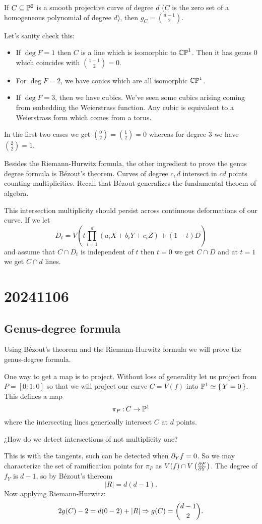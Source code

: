 \documentclass[12pt]{memoir}
\begin{document}
\begin{Prop}
    If $C\subseteq\mathbb{P}^2$ is a smooth projective curve of degree $d$ ($C$ is the zero set of a homogeneous polynomial of degree $d$), then $g_C=\binom{d-1}{2}$.
\end{Prop}

Let's sanity check this:
\begin{itemize}
    \item If $\deg F=1$ then $C$ is a line which is isomorphic to $\mathbb{CP}^1$. Then it has genus 0 which coincides with $\binom{1-1}{2}=0$.
    \item For $\deg F=2$, we have conics which are all isomorphic $\mathbb{CP}^1$. 
    \item If $\deg F=3$, then we have cubics. We've seen some cubics arising coming from embedding the Weierstrass function. Any cubic is equivalent to a Weierstrass form which comes from a torus.
\end{itemize}
In the first two cases we get $\binom{0}{2}=\binom{1}{2}=0$ whereas for degree $3$ we have $\binom{2}{2}=1$.\par
Besides the Riemann-Hurwitz formula, the other ingredient to prove the genus degree formula is Bézout's theorem. Curves of degree $c,d$ intersect in $cd$ points counting multiplicities. Recall that Bézout generalizes the fundamental theoem of algebra.\par
This intersection multiplicity should persist across continuous deformations of our curve. If we let 
$$D_t=V\left(t\prod_{i=1}^{d}(a_iX+b_iY+c_iZ)+(1-t)D\right)$$
and assume that $C\cap D_t$ is independent of $t$ then $t=0$ we get $C\cap D$ and at $t=1$ we get $C\cap d$ lines.

\section{20241106}

\subsection{Genus-degree formula}

Using Bézout's theorem and the Riemann-Hurwitz formula we will prove the genus-degree formula.

\begin{ptcbp}
    One way to get a map is to project. Without loss of generality let us project from $P=[0:1:0]$ so that we will project our curve $C=V(f)$ into $\mathbb{P}^1\simeq\{\,Y=0\,\}$. This defines a map 
    $$\pi_P\mathbin{:}C\to\mathbb{P}^1$$
    where the intersecting lines generically intersect $C$ at $d$ points.
    \begin{center}
        ¿How do we detect intersections of not multiplicity one?
    \end{center}
    This is with the tangents, such can be detected when $\partial_Yf=0$. So we may characterize the set of ramification points for $\pi_P$ as $V(f)\cap V\left(\pdv{F}{Y}\right)$. The degree of $f_Y$ is $d-1$, so by Bézout's thereom 
    $$|R|=d(d-1).$$
    Now applying Riemann-Hurwitz:
    $$2g(C)-2=d(0-2)+|R|\Rightarrow g(C)=\binom{d-1}{2}.$$
\end{ptcbp}
\end{document}
